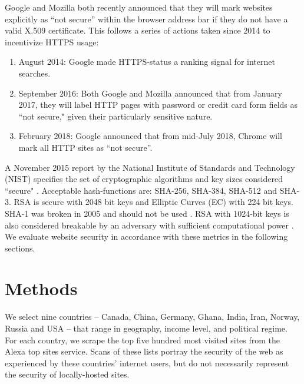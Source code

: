 \documentclass{easychair}
\begin{document}
Google and Mozilla both recently announced that they will mark websites 
explicitly as “not secure” within the browser address bar if they do not
have a valid X.509 certificate. This follows a series of 
actions taken since 2014 to incentivize HTTPS usage:

\begin{enumerate}
    \item 
    August 2014: Google made HTTPS-status a ranking signal
    \cite{httpsranking} for internet searches.
    \item
    September 2016: Both Google \cite{nonsecure} and Mozilla 
    \cite{danger} announced that from January 2017, they will label HTTP
    pages with password or credit card form fields as ``not secure," 
    given their particularly sensitive nature.
    \item
    February 2018: Google announced that from mid-July 
    2018, Chrome will mark all HTTP sites as “not secure”.
\end{enumerate}

A November 2015 report by the National Institute of Standards and 
Technology (NIST) specifies the set of cryptographic algorithms and key 
sizes considered ``secure" \cite{nist}. Acceptable hash-functions are: 
SHA-256, SHA-384, SHA-512 and SHA-3. RSA is secure with 2048 bit keys 
and Elliptic Curves (EC) with 224 bit keys. SHA-1 was broken in 2005 and
should not be used \cite{shattered}. RSA with 1024-bit keys is also 
considered breakable by an adversary with sufficient computational power
\cite{breakssl}. We evaluate website security in accordance with these 
metrics in the following sections.


\section{Methods}

We select nine countries -- Canada, China, Germany, Ghana, India, 
Iran, Norway, Russia and USA  -- that range in geography, income 
level, and political regime. For each country, we scrape the top five 
hundred most visited sites from the Alexa top sites service. Scans of 
these lists portray the security of the web as experienced by these 
countries’ internet users, but do not necessarily represent the 
security of locally-hosted sites. 
\end{document}
